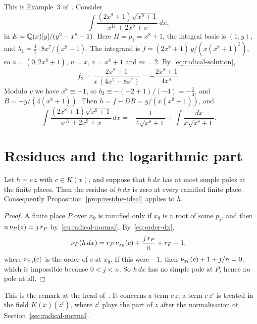 \begin{example}\label{ex:radical-hermite}
This is Example~3 of~\cite{bronstein1998tutorial}. Consider
\[
  \int \frac{(2x^8 + 1) \sqrt{x^8 + 1}}{x^{17} + 2x^9 + x}\, dx ,
\]
in $E = \mathbb{Q}(x)[y]/(y^2 - x^8 - 1)$. Here $H = p_1 = x^8 + 1$, the integral
basis is $(1, y)$, and $\lambda_1 = \frac12 \cdot 8x^7/(x^8 + 1)$. The
integrand is $f = (2x^8 + 1)\, y / (x (x^8 + 1)^2)$, so $a = (0, 2x^8 + 1)$,
$u = x$, $v = x^8 + 1$ and $m = 2$.
By~\eqref{eq:radical-solution},
\[
  f_2 = \frac{2x^8 + 1}{x\, (4x^7 - 8x^7)} = -\frac{2x^8 + 1}{4x^8} .
\]
Modulo $v$ we have $x^8 \equiv -1$, so $b_2 \equiv -(-2 + 1)/(-4) = -\frac14$,
and $B = -y / (4 (x^8 + 1))$. Then $h = f - DB = y/(x (x^8 + 1))$, and
\[
  \int \frac{(2x^8 + 1) \sqrt{x^8 + 1}}{x^{17} + 2x^9 + x}\, dx
  = -\frac{1}{4 \sqrt{x^8 + 1}} + \int \frac{dx}{x \sqrt{x^8 + 1}} .
\]
\end{example}

\section{Residues and the logarithmic part}\label{sec:radical-log}

\begin{proposition}\label{prop:radical-residues}
Let $h = c\, z$ with $c \in K(x)$, and suppose that $h\,dx$ has at most
simple poles at the finite places. Then the residue of $h\,dx$ is zero at
every ramified finite place. Consequently
Proposition~\ref{prop:residue-ideal} applies to $h$.
\end{proposition}

\begin{proof}
A finite place $P$ over $x_0$ is ramified only if $x_0$ is a root of some
$p_j$, and then $n\, \nu_{P}(z) = j\, r_P$ by~\eqref{eq:radical-normal}.
By~\eqref{eq:order-dx},
\[
  \nu_{P}(h\,dx) = r_P\, \nu_{x_0}(c) + \frac{j\, r_P}{n} + r_P - 1 ,
\]
where $\nu_{x_0}(c)$ is the order of $c$ at $x_0$. If this were $-1$, then
$\nu_{x_0}(c) + 1 + j/n = 0$, which is impossible because $0 < j < n$. So
$h\,dx$ has no simple pole at $P$, hence no pole at all.
\end{proof}

This is the remark at the head of~\cite[\S5.4]{trager1984}. It concerns a
term $c\,z$; a term $c\,z^i$ is treated in the field $K(x)(z^i)$, where $z^i$
plays the part of $z$ after the normalisation of
Section~\ref{sec:radical-normal}.

